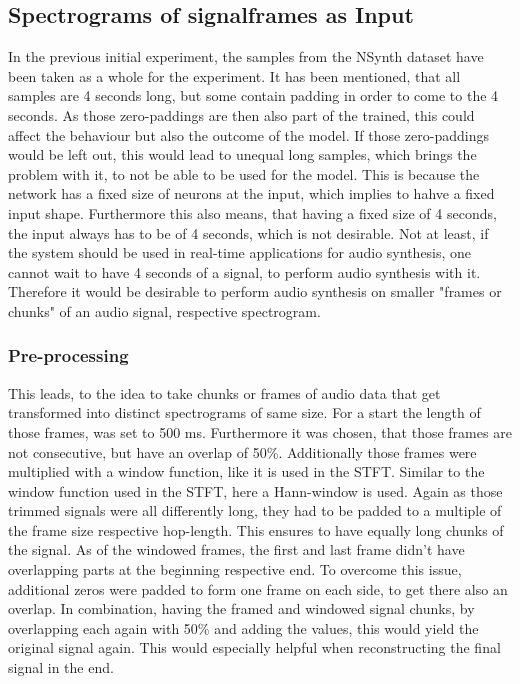 \subsection{Spectrograms of signalframes as Input}
In the previous initial experiment, the samples from the NSynth dataset have been taken as a whole for the experiment. It has been mentioned, that all samples are 4 seconds long, but some contain padding in order to come to the 4 seconds. As those zero-paddings are then also part of the trained, this could affect the behaviour but also the outcome of the model. If those zero-paddings would be left out, this would lead to unequal long samples, which brings the problem with it, to not be able to be used for the model. This is because the network has a fixed size of neurons at the input, which implies to hahve a fixed input shape. Furthermore this also means, that having a fixed size of 4 seconds, the input always has to be of 4 seconds, which is not desirable. Not at least, if the system should be used in real-time applications for audio synthesis, one cannot wait to have 4 seconds of a signal, to perform audio synthesis with it. Therefore it would be desirable to perform audio synthesis on smaller "frames or chunks" of an audio signal, respective spectrogram. 

\subsubsection{Pre-processing}
This leads, to the idea to take chunks or frames of audio data that get transformed into distinct spectrograms of same size. For a start the length of those frames, was set to 500 ms. Furthermore it was chosen, that those frames are not consecutive, but have an overlap of 50\%. Additionally those frames were multiplied with a window function, like it is used in the STFT. Similar to the window function used in the STFT, here a Hann-window is used. Again as those trimmed signals were all differently long, they had to be padded to a multiple of the frame size respective hop-length. This ensures to have equally long chunks of the signal. As of the windowed frames, the first and last frame didn't have overlapping parts at the beginning respective end. To overcome this issue, additional zeros were padded to form one frame on each side, to get there also an overlap. In combination, having the framed and windowed signal chunks, by overlapping each again with 50\% and adding the values, this would yield the original signal again. This would especially helpful when reconstructing the final signal in the end. 

